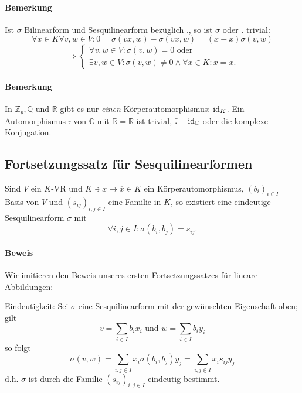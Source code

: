 \paragraph{Bemerkung}
	Ist $ \sigma $ Bilinearform und Sesquilinearform bezüglich $ \bar{.} $, so ist $ \sigma $ oder $ \bar{.} $ trivial:
		\[ \forall x\in K\forall v,w\in V: 0 = \sigma(vx,w) - \sigma(vx,w) = (x-\overline{x})\sigma(v,w)  \]
		\[ \Rightarrow \begin{cases}
		\forall v,w\in V: \sigma(v,w) = 0 \text{ oder}\\
		\exists v,w\in V: \sigma(v,w)\neq 0 \land \forall x\in K: \overline{x} = x.
		\end{cases} \]
\paragraph{Bemerkung}
	In $ \mathbb{Z}_p, \mathbb{Q} $ und $ \mathbb{R} $ gibt es nur \emph{einen} Körperautomorphismus: $ \operatorname{id}_K $. Ein Automorphismus $ \bar{.} $ von $ \mathbb{C} $ mit $ \overline{\mathbb{R}} = \mathbb{R} $ ist trivial, $ \bar{.} = \operatorname{id}_\mathbb{C} $ oder die komplexe Konjugation.
	
\subsection{Fortsetzungssatz für Sesquilinearformen}
\begin{Satz}
	Sind $ V $ ein $ K $-VR und $ K\ni x\mapsto \overline{x}\in K $ ein Körperautomorphismus, $ (b_i)_{i\in I} $ Basis von $ V $ und $ (s_{ij})_{i,j\in I} $ eine Familie in $ K $, so existiert eine eindeutige Sesquilinearform $ \sigma $ mit
		\[ \forall i,j\in I:\sigma(b_i,b_j) = s_{ij}. \]
\end{Satz}

\paragraph{Beweis}
	Wir imitieren den Beweis unseres ersten Fortsetzungssatzes für lineare Abbildungen:
	
	{Eindeutigkeit:}
	Sei $ \sigma $ eine Sesquilinearform mit der gewünschten Eigenschaft oben; gilt
		\[ v = \sum_{i\in I}b_ix_i \text{ und }w = \sum_{i\in I}b_i y_i \]
	so folgt
		\[ \sigma(v,w) = \sum_{i,j\in I}\overline{x_i}\sigma(b_i,b_j)y_j = \sum_{i,j\in I}\overline{x_i}s_{ij}y_j \]
	d.h. $ \sigma $ ist durch die Familie $ (s_{ij})_{i,j\in I} $ eindeutig bestimmt.
	
